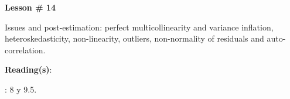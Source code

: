 \documentclass[letterpaper]{article}
\renewenvironment{itemize}{
  \begin{list}{}{
    \setlength{\leftmargin}{1.5em}
  }
}{
  \end{list}
}
\begin{document}
\begin{enumerate}
\begin{itemize}
\begin{itemize}
\begin{itemize}
							\end{itemize}
					\end{itemize}
			\end{itemize}



			\begin{itemize} 
				\item[$\bullet$] {\bf Lesson \# 14} %
					\begin{itemize} 
						\item[$\circ$] Issues and post-estimation: perfect multicollinearity and variance inflation, heteroskedasticity, non-linearity, outliers, non-normality of residuals and auto-correlation. %
						\item[$\circ$] {\bf Reading(s)}: 
						\begin{itemize}
						\item[$\diamond$] \textcite{Wooldridge2002}: 8 y 9.5.
						\end{itemize}
					\end{itemize}
			\end{itemize}







\end{enumerate}
\end{document}
